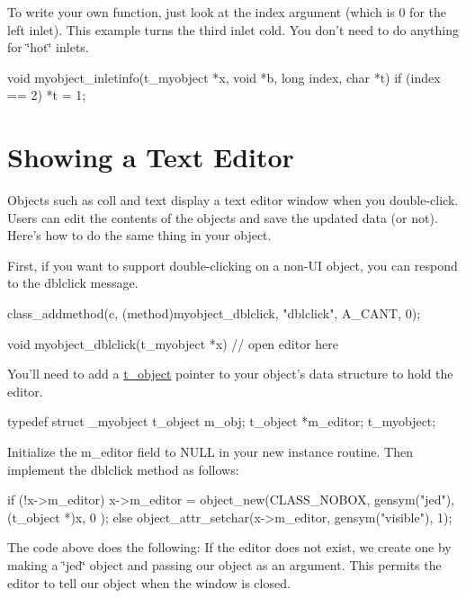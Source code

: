 To write your own function, just look at the index argument (which is 0 for the left inlet). This example turns the third inlet cold. You don't need to do anything for \char`\"{}hot\char`\"{} inlets.


\begin{DoxyCode}
    void myobject_inletinfo(t_myobject *x, void *b, long index, char *t)
    {
        if (index == 2)
            *t = 1;
    }
\end{DoxyCode}
\hypertarget{chapter_enhancements_chapter_enhancements_ed}{}\section{Showing a Text Editor}\label{chapter_enhancements_chapter_enhancements_ed}
Objects such as coll and text display a text editor window when you double-\/click. Users can edit the contents of the objects and save the updated data (or not). Here's how to do the same thing in your object.

First, if you want to support double-\/clicking on a non-\/UI object, you can respond to the dblclick message.


\begin{DoxyCode}
    class_addmethod(c, (method)myobject_dblclick, "dblclick", A_CANT, 0);

    void myobject_dblclick(t_myobject *x)
    {
        // open editor here
    }
\end{DoxyCode}


You'll need to add a \hyperlink{structt__object}{t\_\-object} pointer to your object's data structure to hold the editor.


\begin{DoxyCode}
    typedef struct _myobject
    {
        t_object m_obj;
        t_object *m_editor;
    } t_myobject;
\end{DoxyCode}


Initialize the m\_\-editor field to NULL in your new instance routine. Then implement the dblclick method as follows: 
\begin{DoxyCode}
        if (!x->m_editor)
            x->m_editor = object_new(CLASS_NOBOX, gensym("jed"), (t_object *)x, 0
      );
        else
            object_attr_setchar(x->m_editor, gensym("visible"), 1);
\end{DoxyCode}


The code above does the following: If the editor does not exist, we create one by making a \char`\"{}jed\char`\"{} object and passing our object as an argument. This permits the editor to tell our object when the window is closed.

